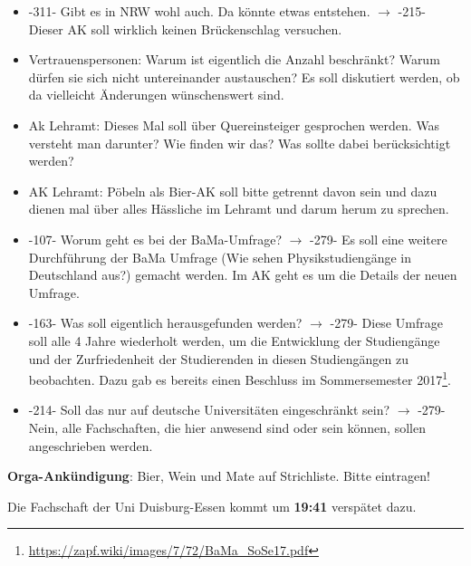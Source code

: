     \begin{itemize}
      \item -311- Gibt es in NRW wohl auch. Da könnte etwas entstehen. $\rightarrow$ -215- Dieser AK soll wirklich keinen Brückenschlag versuchen.
      \item Vertrauenspersonen: Warum ist eigentlich die Anzahl beschränkt? Warum dürfen sie sich nicht untereinander austauschen? Es soll diskutiert werden, ob da vielleicht Änderungen wünschenswert sind.
      \item Ak Lehramt: Dieses Mal soll über Quereinsteiger gesprochen werden. Was versteht man darunter? Wie finden wir das? Was sollte dabei berücksichtigt werden?
      \item AK Lehramt: Pöbeln als Bier-AK soll bitte getrennt davon sein und dazu dienen mal über alles Hässliche im Lehramt und darum herum zu sprechen.
      \item -107- Worum geht es bei der BaMa-Umfrage? $\rightarrow$ -279- Es soll eine weitere Durchführung der BaMa Umfrage (Wie sehen Physikstudiengänge in Deutschland aus?) gemacht werden. Im AK geht es um die Details der neuen Umfrage.
      \item -163- Was soll eigentlich herausgefunden werden? $\rightarrow$ -279- Diese Umfrage soll alle 4 Jahre wiederholt werden, um die Entwicklung der Studiengänge und der Zurfriedenheit der Studierenden in diesen Studiengängen zu beobachten. Dazu gab es bereits einen Beschluss im Sommersemester 2017\footnote{\url{https://zapf.wiki/images/7/72/BaMa_SoSe17.pdf}}.
      \item -214- Soll das nur auf deutsche Universitäten eingeschränkt sein? $\rightarrow$ -279- Nein, alle Fachschaften, die hier anwesend sind oder sein können, sollen angeschrieben werden.
    \end{itemize}

    \begin{info}{}
      \textbf{Orga-Ankündigung}: Bier, Wein und Mate auf Strichliste. Bitte eintragen!
    \end{info}

    \begin{info}{}
      Die Fachschaft der Uni Duisburg-Essen kommt um \textbf{19:41} verspätet dazu.
    \end{info}

